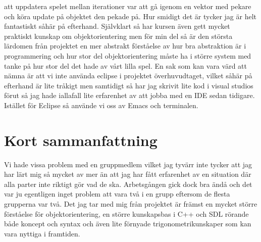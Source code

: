 \documentclass{TDP003mall}
\begin{document}
att uppdatera spelet mellan iterationer var att gå igenom en vektor med pekare och köra update på objektet den pekade på. Hur smidigt det är
tycker jag är helt fantastiskt såhär på efterhand. Självklart så har kursen även gett mycket praktiskt kunskap om objektorientering
men för min del så är den största lärdomen från projektet en mer abstrakt förståelse av hur bra abstraktion är i programmering och hur
stor del objektorientering måste ha i större system med tanke på hur stor del det hade av vårt lilla spel. \newline \newline
En sak som kan vara värd att nämna är att vi inte använda eclipse i projektet överhuvudtaget, vilket såhär på efterhand är lite tråkigt
men samtidigt så har jag skrivit lite kod i visual studios förut så jag hade iallafall lite erfarenhet av att jobba med en IDE sedan tidigare.
Istället för Eclipse så använde vi oss av Emacs och terminalen.
   
\section{Kort sammanfattning}
Vi hade vissa problem med en gruppmedlem vilket jag tyvärr inte tycker att jag har lärt mig så mycket av mer än att jag har fått erfarenhet
av en situation där alla parter inte riktigt gör vad de ska. Arbetsgången gick dock bra ändå och det var ju egentligen inget
problem att vara två i en grupp eftersom de flesta grupperna var två. \newline \newline
Det jag tar med mig från projektet är främst en mycket större förståelse för objektorientering, en större kunskapsbas i C++ och SDL rörande både
koncept och syntax och även lite förnyade trigonometrikunskaper som kan vara nyttiga i framtiden. 
\end{document}
